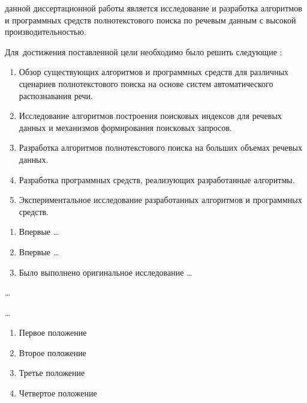 
{\aim} данной диссертационной работы является исследование и разработка алгоритмов и программных средств полнотекстового поиска по речевым данным с высокой производительностью.

Для~достижения поставленной цели необходимо было решить следующие {\tasks}:
\begin{enumerate}[beginpenalty=10000] %
  \item Обзор существующих алгоритмов и программных средств для различных сценариев полнотекстового поиска на основе систем автоматического распознавания речи.
  \item Исследование алгоритмов построения поисковых индексов для речевых данных и механизмов формирования поисковых запросов.
  \item Разработка алгоритмов полнотекстового поиска на больших объемах речевых данных.
  \item Разработка программных средств, реализующих разработанные алгоритмы.
  \item Экспериментальное исследование разработанных алгоритмов и программных средств.
\end{enumerate}

{\novelty}
\begin{enumerate}[beginpenalty=10000] %
  \item Впервые \ldots
  \item Впервые \ldots
  \item Было выполнено оригинальное исследование \ldots
\end{enumerate}

{\influence} \ldots

{\methods} \ldots

{}
\begin{enumerate}[beginpenalty=10000] %
  \item Первое положение
  \item Второе положение
  \item Третье положение
  \item Четвертое положение
\end{enumerate}

